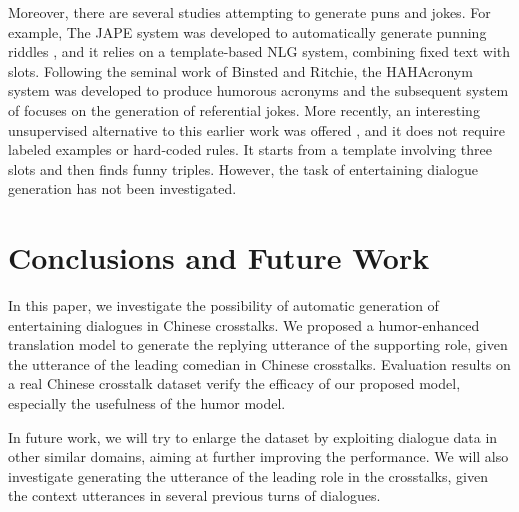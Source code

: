 \documentclass[letterpaper]{article} %
\begin{document}
\begin{CJK*}{UTF8}{gbsn}
Moreover, there are several studies attempting to generate puns and jokes. For example, The JAPE system was developed to automatically generate punning riddles \cite{binsted1994implemented,binsted1997computational}, and it relies on a template-based NLG system, combining fixed text with slots. Following the seminal work of Binsted and Ritchie, the HAHAcronym system was developed to produce humorous acronyms \cite{stock2005act} and the subsequent system of \cite{binsted2003pun} focuses on the generation of referential jokes. More recently, an interesting unsupervised alternative to this earlier work was offered \cite{petrovic2013unsupervised}, and it does not require labeled examples or hard-coded rules. It starts from a template involving three slots and then finds funny triples. However, the task of entertaining dialogue generation has not been investigated. 



%


\section{Conclusions and Future Work}

In this paper, we investigate the possibility of automatic generation of entertaining dialogues in Chinese crosstalks. We proposed a humor-enhanced translation model to generate the replying utterance of the supporting role, given the utterance of the leading comedian in Chinese crosstalks. Evaluation results on a real Chinese crosstalk dataset verify the efficacy of our proposed model, especially the usefulness of the humor model.  

In future work, we will try to enlarge the dataset by exploiting dialogue data in other similar domains, aiming at further improving the performance. We will also investigate generating the utterance of the leading role in the crosstalks, given the context utterances in several previous turns of dialogues. 



\end{CJK*}
\end{document}
